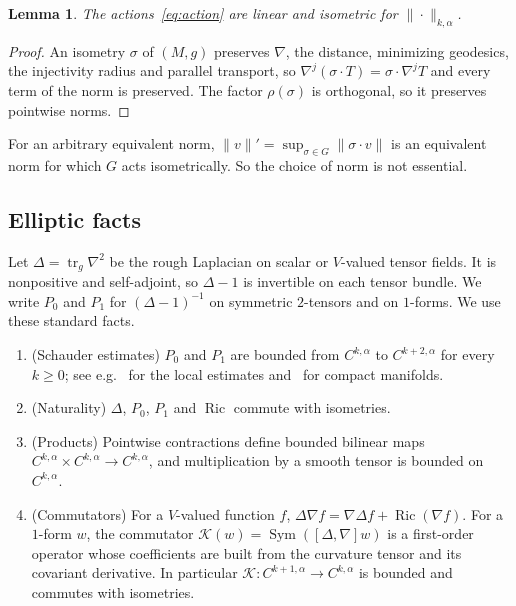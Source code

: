 \documentclass[11pt]{amsart}
\newtheorem{lemma}[theorem]{Lemma}
\theoremstyle{definition}
\newcommand{\Sym}{\operatorname{Sym}}
\newcommand{\Ric}{\operatorname{Ric}}
\newcommand{\tr}{\operatorname{tr}}
\newcommand{\cK}{\mathcal{K}}
\begin{document}
\begin{lemma}\label{lem:isometric-action}
The actions~\eqref{eq:action} are linear and isometric for $\|\cdot\|_{k,\alpha}$.
\end{lemma}

\begin{proof}
An isometry $\sigma$ of $(M,g)$ preserves $\nabla$, the distance, minimizing geodesics, the
injectivity radius and parallel transport, so $\nabla^j(\sigma\cdot T)=\sigma\cdot\nabla^jT$ and
every term of the norm is preserved. The factor $\rho(\sigma)$ is orthogonal, so it preserves
pointwise norms.
\end{proof}

For an arbitrary equivalent norm, $\|v\|' = \sup_{\sigma\in G}\|\sigma\cdot v\|$ is an equivalent
norm for which $G$ acts isometrically. So the choice of norm is not essential.

\subsection{Elliptic facts}
Let $\Delta=\tr_g\nabla^2$ be the rough Laplacian on scalar or $V$-valued tensor fields. It is
nonpositive and self-adjoint, so $\Delta-1$ is invertible on each tensor bundle. We write $P_0$ and
$P_1$ for $(\Delta-1)^{-1}$ on symmetric $2$-tensors and on $1$-forms. We use these standard facts.

\begin{enumerate}[label=(E\arabic*)]
\item\label{E:schauder} (Schauder estimates) $P_0$ and $P_1$ are bounded from $C^{k,\alpha}$ to
$C^{k+2,\alpha}$ for every $k\ge0$; see e.g.~\cite[Ch.~6]{GT} for the local estimates and~\cite{Aubin} for compact manifolds.
\item\label{E:natural} (Naturality) $\Delta$, $P_0$, $P_1$ and $\Ric$ commute with isometries.
\item\label{E:products} (Products) Pointwise contractions define bounded bilinear maps
$C^{k,\alpha}\times C^{k,\alpha}\to C^{k,\alpha}$, and multiplication by a smooth tensor is bounded
on $C^{k,\alpha}$.
\item\label{E:bochner} (Commutators) For a $V$-valued function $f$,
$\Delta\nabla f = \nabla\Delta f + \Ric(\nabla f)$. For a $1$-form $w$, the commutator
$\cK(w) = \Sym([\Delta,\nabla]w)$ is a first-order operator whose coefficients are built from the
curvature tensor and its covariant derivative. In particular
$\cK\colon C^{k+1,\alpha}\to C^{k,\alpha}$ is bounded and commutes with isometries.
\end{enumerate}
\end{document}
